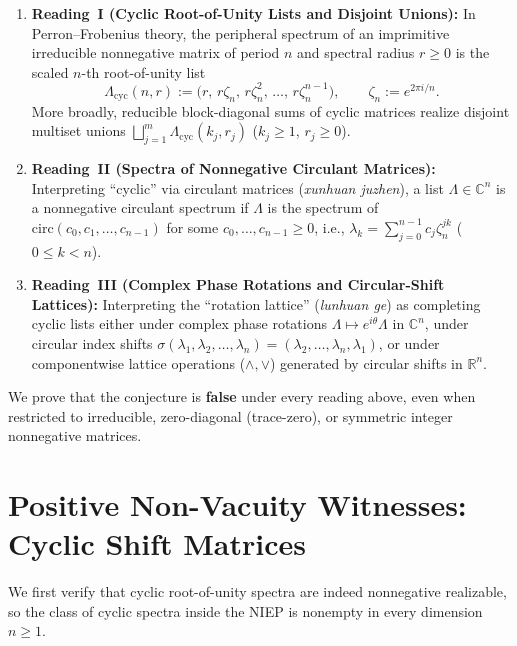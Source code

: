 \documentclass[11pt]{article}
\theoremstyle{definition}
\theoremstyle{remark}
\begin{document}
\begin{enumerate}
  \item \textbf{Reading~I (Cyclic Root-of-Unity Lists and Disjoint Unions):}
    In Perron--Frobenius theory, the peripheral spectrum of an imprimitive irreducible
    nonnegative matrix of period $n$ and spectral radius $r \ge 0$ is the scaled $n$-th
    root-of-unity list
    \[
      \Lambda_{\mathrm{cyc}}(n, r)
      := \bigl(r, \, r\zeta_n, \, r\zeta_n^2, \, \dots, \, r\zeta_n^{n-1}\bigr),
      \qquad \zeta_n := e^{2\pi i / n}.
    \]
    More broadly, reducible block-diagonal sums of cyclic matrices realize disjoint
    multiset unions $\bigsqcup_{j=1}^m \Lambda_{\mathrm{cyc}}(k_j, r_j)$ ($k_j \ge 1$,
    $r_j \ge 0$).

  \item \textbf{Reading~II (Spectra of Nonnegative Circulant Matrices):}
    Interpreting ``cyclic'' via circulant matrices (\emph{xunhuan juzhen}), a list
    $\Lambda \in \mathbb{C}^n$ is a nonnegative circulant spectrum if $\Lambda$ is the
    spectrum of $\mathrm{circ}(c_0, c_1, \dots, c_{n-1})$ for some $c_0, \dots, c_{n-1}
    \ge 0$, i.e., $\lambda_k = \sum_{j=0}^{n-1} c_j \zeta_n^{jk}$ ($0 \le k < n$).

  \item \textbf{Reading~III (Complex Phase Rotations and Circular-Shift Lattices):}
    Interpreting the ``rotation lattice'' (\emph{lunhuan ge}) as completing cyclic lists
    either under complex phase rotations $\Lambda \mapsto e^{i\theta}\Lambda$ in
    $\mathbb{C}^n$, under circular index shifts $\sigma(\lambda_1, \lambda_2, \dots,
    \lambda_n) = (\lambda_2, \dots, \lambda_n, \lambda_1)$, or under componentwise lattice
    operations ($\wedge, \vee$) generated by circular shifts in $\mathbb{R}^n$.
\end{enumerate}

We prove that the conjecture is \textbf{false} under every reading above, even when
restricted to irreducible, zero-diagonal (trace-zero), or symmetric integer nonnegative
matrices.

\section{Positive Non-Vacuity Witnesses: Cyclic Shift Matrices}

We first verify that cyclic root-of-unity spectra are indeed nonnegative realizable, so
the class of cyclic spectra inside the NIEP is nonempty in every dimension $n \ge 1$.
\end{document}
